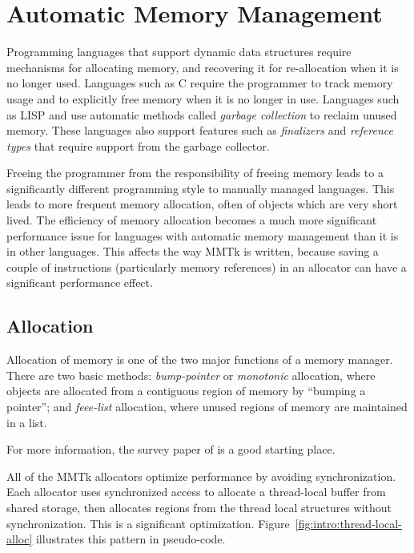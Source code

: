 %
\section{Automatic Memory Management}

Programming languages that support dynamic data structures require mechanisms for allocating memory,
and recovering it for re-allocation when it is no longer used.  Languages such as C require the programmer
to track memory usage and to explicitly free memory when it is no longer in use.  Languages such as LISP
and \java use automatic methods called \emph{garbage collection} to reclaim unused memory.  These languages
also support features such as \emph{finalizers} and \emph{reference types} that require support from the
garbage collector.

Freeing the programmer from the responsibility of freeing memory leads to a significantly different programming
style to manually managed languages. This leads to more frequent memory allocation, often of objects which
are very short lived.  The efficiency of memory allocation becomes a much more significant performance 
issue for languages with automatic memory management than it is in other languages.  This affects the way
MMTk is written, because saving a couple of instructions (particularly memory references) in an allocator
can have a significant performance effect.


\subsection{Allocation}

Allocation of memory is one of the two major functions of a memory manager.  There are
two basic methods: \emph{bump-pointer} or \emph{monotonic} allocation, where objects
are allocated from a contiguous region of memory by ``bumping a pointer''; and 
\emph{feee-list} allocation, where unused regions of memory are maintained in
a list.

For more information, the survey paper of \citet{WJNB:95} is a good starting place.

All of the MMTk allocators optimize performance by avoiding synchronization.  
Each allocator uses synchronized access to allocate a thread-local buffer from shared storage,
then allocates regions from the thread local structures without synchronization.  This
is a significant optimization.  Figure~\ref{fig:intro:thread-local-alloc} 
illustrates this pattern in  pseudo-code.

